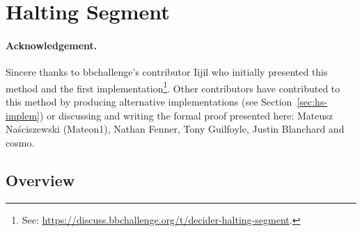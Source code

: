 \newcommand{\HS}{Halting Segment\xspace}

\section{Halting Segment}\label{sec:halting-segment}

\paragraph{Acknowledgement.} Sincere thanks to bbchallenge's contributor Iijil who initially presented this method and the first implementation\footnote{See: \url{https://discuss.bbchallenge.org/t/decider-halting-segment}.}. Other contributors have contributed to this method by producing alternative implementations (see Section~\ref{sec:hs-implem}) or discussing and writing the formal proof presented here: Mateusz Naściszewski (Mateon1), Nathan Fenner, Tony Guilfoyle, Justin Blanchard and cosmo.

\subsection{Overview}

